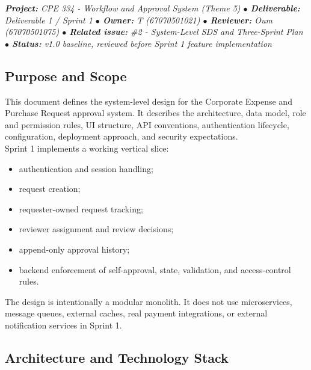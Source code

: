 \documentclass[11pt,a4paper]{article}
\begin{document}
\begin{tcolorbox}[colback=lightbg,colframe=secondary,arc=2mm,boxrule=0.8pt]\small\itshape
\textbf{Project:} CPE 334 - Workflow and Approval System (Theme 5) \quad $\bullet$ \quad \textbf{Deliverable:} Deliverable 1 / Sprint 1 \quad $\bullet$ \quad \textbf{Owner:} T (67070501021) \quad $\bullet$ \quad \textbf{Reviewer:} Oum (67070501075) \quad $\bullet$ \quad \textbf{Related issue:} \#2 - System-Level SDS and Three-Sprint Plan \quad $\bullet$ \quad \textbf{Status:} v1.0 baseline, reviewed before Sprint 1 feature implementation
\end{tcolorbox}


\subsection{Purpose and Scope}

This document defines the system-level design for the Corporate Expense and Purchase Request approval system. It describes the architecture, data model, role and permission rules, UI structure, API conventions, authentication lifecycle, configuration, deployment approach, and security expectations.\\

Sprint 1 implements a working vertical slice:\\

\begin{itemize}[leftmargin=*,itemsep=2pt,topsep=2pt]
  \item authentication and session handling;
  \item request creation;
  \item requester-owned request tracking;
  \item reviewer assignment and review decisions;
  \item append-only approval history;
  \item backend enforcement of self-approval, state, validation, and access-control rules.
\end{itemize}
The design is intentionally a modular monolith. It does not use microservices, message queues, external caches, real payment integrations, or external notification services in Sprint 1.\\


\subsection{Architecture and Technology Stack}
\end{document}
